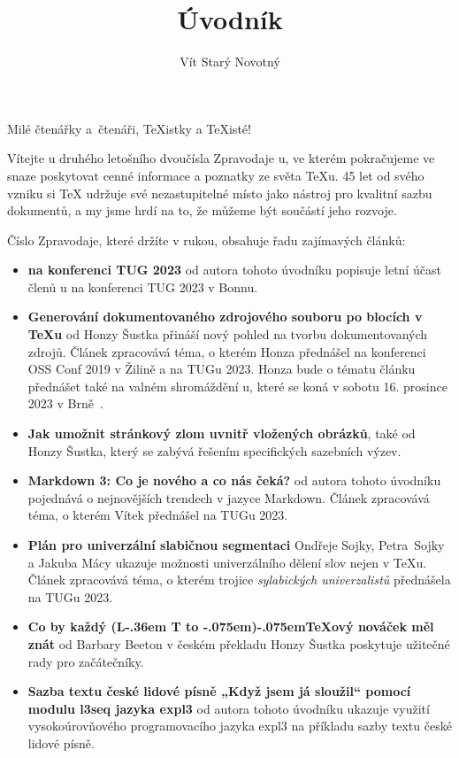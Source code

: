 \documentclass{csbulletin}
\makeatletter
\DeclareRobustCommand{\La}{L\kern-.36em%
        {\sbox\z@ T%
         \vbox to\ht\z@{\hbox{\check@mathfonts
                              \fontsize\sf@size\z@
                              \math@fontsfalse\selectfont
                              A}%
                        \vss}%
        }}
\def\AllTeX{(\La\kern-.075em)\kern-.075em\TeX}
\makeatother
\begin{document}
\title{Úvodník}
\author{Vít Starý Novotný}
\maketitle

Milé čtenářky a~čtenáři, \TeX istky a \TeX isté!

\medskip

Vítejte u druhého letošního dvoučísla Zpravodaje \CSTUG u, ve kterém pokračujeme ve snaze poskytovat cenné informace a poznatky ze světa \TeX u. 45 let od svého vzniku si \TeX{} udržuje své nezastupitelné místo jako nástroj pro kvalitní sazbu dokumentů, a my jsme hrdí na to, že můžeme být součástí jeho rozvoje.

Číslo Zpravodaje, které držíte v rukou, obsahuje řadu zajímavých článků:

\begin{itemize}
  \item \textbf{\CSTUG{} na konferenci TUG 2023} od autora tohoto úvodníku popisuje letní účast členů \CSTUG u na konferenci TUG 2023 v Bonnu.
  \item \textbf{Generování dokumentovaného zdrojového souboru po blocích v \TeX u} od Honzy Šustka přináší nový pohled na tvorbu dokumentovaných zdrojů. Článek zpracovává téma, o kterém Honza přednášel na konferenci OSS Conf 2019 v Žilině a na TUGu 2023. Honza bude o tématu článku přednášet také na valném shromáždění \CSTUG u, které se koná v sobotu 16. prosince 2023 v Brně~\cite{starynovotny2023valna}.
  \item \textbf{Jak umožnit stránkový zlom uvnitř vložených obrázků}, také od Honzy Šustka, který se zabývá řešením specifických sazebních výzev.
  \item \textbf{Markdown 3: Co je nového a co nás čeká?} od autora tohoto úvodníku pojednává o nejnovějších trendech v jazyce Markdown. Článek zpracovává téma, o kterém Vítek přednášel na TUGu 2023.
  \item \textbf{Plán pro univerzální slabičnou segmentaci} Ondřeje Sojky, Petra~Sojky a Jakuba Mácy ukazuje možnosti univerzálního dělení slov nejen v \TeX u. Článek zpracovává téma, o kterém trojice \emph{sylabických univerzalistů} přednášela na TUGu 2023.
  \item \textbf{Co by každý \AllTeX ový nováček měl znát} od Barbary Beeton v českém překladu Honzy Šustka poskytuje užitečné rady pro začátečníky.
  \item \textbf{Sazba textu české lidové písně „Když jsem já
sloužil“ pomocí modulu l3seq jazyka expl3} od autora tohoto úvodníku ukazuje využití vysokoúrovňového programovacího jazyka expl3 na příkladu sazby textu české lidové písně.
\end{itemize}
\end{document}
